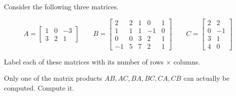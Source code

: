 \begin{applicationActivities}
\begin{activity}{10}
Consider the following three matrices.

\[
  A = \begin{bmatrix}1&0&-3\\3&2&1\end{bmatrix}
    \hspace{2em}
  B = \begin{bmatrix}2&2&1&0&1\\1&1&1&-1&0\\0&0&3&2&1\\-1&5&7&2&1\end{bmatrix}
    \hspace{2em}
  C = \begin{bmatrix}2&2\\0&-1\\3&1\\4&0\end{bmatrix}
\]

\begin{subactivity}
Label each of these matrices
with its number of rows \(\times\) columns.
\end{subactivity}
\begin{subactivity} 
Only one of the matrix products
\(AB,AC,BA,BC,CA,CB\) can actually be computed.
Compute it.
\end{subactivity}
\end{activity}


\end{applicationActivities}
